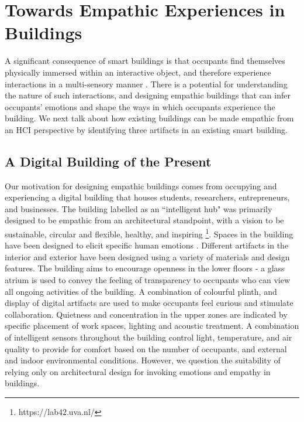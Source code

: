 \documentclass [sigconf, review, anonymous] {acmart}
\begin{document}




\section{Towards Empathic Experiences in Buildings}
\label{sec:empathic-buildings}
A significant consequence of smart buildings is that occupants find themselves physically immersed within an interactive object, and therefore experience interactions in a multi-sensory manner \cite{nembrini2017human}. There is a potential for understanding the nature of such interactions, and designing empathic buildings that can infer occupants' emotions and shape the ways in which occupants experience the building. We next talk about how existing buildings can be made empathic from an HCI perspective by identifying three artifacts in an existing smart building.  
 

\subsection{A Digital Building of the Present}
\label{subsec:building}
Our motivation for designing empathic buildings comes from occupying and experiencing a digital building that houses students, researchers, entrepreneurs, and businesses. The building labelled as an ``intelligent hub" was primarily designed to be empathic from an architectural standpoint, with a vision to be sustainable, circular and flexible, healthy, and inspiring \footnote{https://lab42.uva.nl/}. Spaces in the building have been designed to elicit specific human emotions \cite{silo_michiel_2022}. Different artifacts in the interior and exterior have been designed using a variety of materials and design features. The building aims to encourage openness in the lower floors - a glass atrium is used to convey the feeling of transparency to occupants who can view all ongoing activities of the building. A combination of colourful plinth, and display of digital artifacts are used to make occupants feel curious and stimulate collaboration. Quietness and concentration in the upper zones are indicated by specific placement of work spaces, lighting and acoustic treatment. A combination of intelligent sensors throughout the building control light, temperature, and air quality to provide for comfort based on the number of occupants, and external and indoor environmental conditions. However, we question the suitability of relying only on architectural design for invoking emotions and empathy in buildings. 
\end{document}
